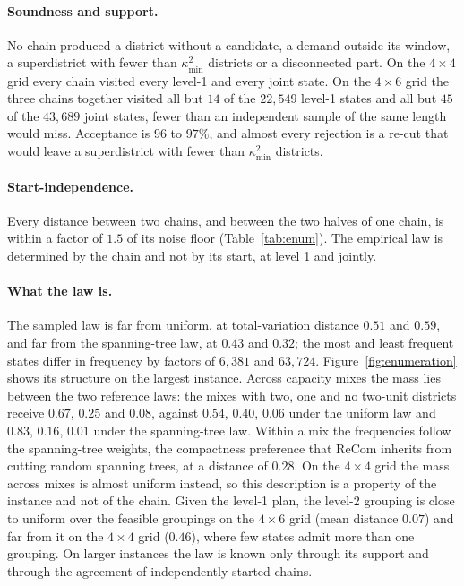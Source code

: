 \paragraph{Soundness and support.}
No chain produced a district without a candidate, a demand outside its window, a superdistrict with fewer than $\kappa^2_{\min}$ districts or a disconnected part. On the $4\times4$ grid every chain visited every level-1 and every joint state. On the $4\times6$ grid the three chains together visited all but $14$ of the $22{,}549$ level-1 states and all but $45$ of the $43{,}689$ joint states, fewer than an independent sample of the same length would miss. Acceptance is $96$ to $97\%$, and almost every rejection is a re-cut that would leave a superdistrict with fewer than $\kappa^2_{\min}$ districts.

\paragraph{Start-independence.}
Every distance between two chains, and between the two halves of one chain, is within a factor of $1.5$ of its noise floor (Table~\ref{tab:enum}). The empirical law is determined by the chain and not by its start, at level 1 and jointly.

\paragraph{What the law is.}
The sampled law is far from uniform, at total-variation distance $0.51$ and $0.59$, and far from the spanning-tree law, at $0.43$ and $0.32$; the most and least frequent states differ in frequency by factors of $6{,}381$ and $63{,}724$. Figure~\ref{fig:enumeration} shows its structure on the largest instance. Across capacity mixes the mass lies between the two reference laws: the mixes with two, one and no two-unit districts receive $0.67$, $0.25$ and $0.08$, against $0.54$, $0.40$, $0.06$ under the uniform law and $0.83$, $0.16$, $0.01$ under the spanning-tree law. Within a mix the frequencies follow the spanning-tree weights, the compactness preference that ReCom inherits from cutting random spanning trees, at a distance of $0.28$. On the $4\times4$ grid the mass across mixes is almost uniform instead, so this description is a property of the instance and not of the chain. Given the level-1 plan, the level-2 grouping is close to uniform over the feasible groupings on the $4\times6$ grid (mean distance $0.07$) and far from it on the $4\times4$ grid ($0.46$), where few states admit more than one grouping. On larger instances the law is known only through its support and through the agreement of independently started chains.

